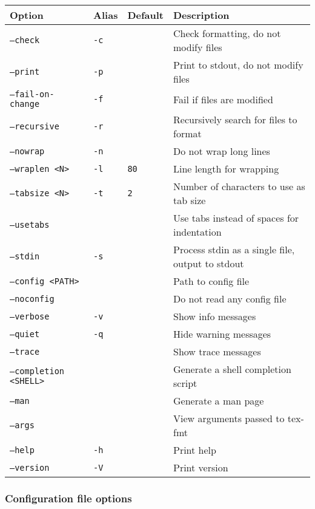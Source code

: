 \documentclass{scrartcl}
\begin{document}
\begin{longtable}{|l|l|l|l|}
\hline
Option & Alias & Default & Description\\
\hline
\texttt{--check} & \texttt{-c} &  & Check formatting, do not modify files\\
\texttt{--print} & \texttt{-p} &  & Print to stdout, do not modify files\\
\texttt{--fail-on-change} & \texttt{-f} &  & Fail if files are modified\\
\texttt{--recursive} & \texttt{-r} &  & Recursively search for files to format\\
\texttt{--nowrap} & \texttt{-n} &  & Do not wrap long lines\\
\texttt{--wraplen \textless{}N\textgreater{}} & \texttt{-l} & \texttt{80} & Line length for wrapping\\
\texttt{--tabsize \textless{}N\textgreater{}} & \texttt{-t} & \texttt{2} & Number of characters to use as tab size\\
\texttt{--usetabs} &  &  & Use tabs instead of spaces for indentation\\
\texttt{--stdin} & \texttt{-s} &  & Process stdin as a single file, output to stdout\\
\texttt{--config \textless{}PATH\textgreater{}} &  &  & Path to config file\\
\texttt{--noconfig} &  &  & Do not read any config file\\
\texttt{--verbose} & \texttt{-v} &  & Show info messages\\
\texttt{--quiet} & \texttt{-q} &  & Hide warning messages\\
\texttt{--trace} &  &  & Show trace messages\\
\texttt{--completion \textless{}SHELL\textgreater{}} &  &  & Generate a shell completion script\\
\texttt{--man} &  &  & Generate a man page\\
\texttt{--args} &  &  & View arguments passed to tex-fmt\\
\texttt{--help} & \texttt{-h} &  & Print help\\
\texttt{--version} & \texttt{-V} &  & Print version\\
\hline
\end{longtable}

\subsubsection{Configuration file options}\hypertarget{configuration-file-options}{}\label{configuration-file-options}
\end{document}
